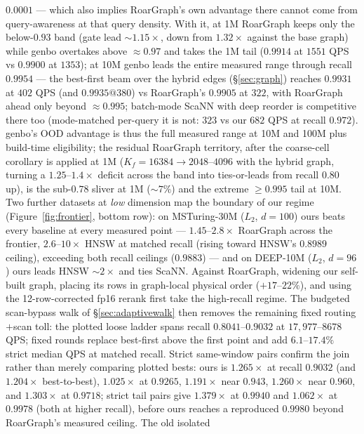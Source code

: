 \documentclass{article}
\begin{document}
$0.0001$ --- which also implies RoarGraph's own advantage there cannot come from
query-awareness at that query density. With it, at 1M RoarGraph keeps only the below-$0.93$ band
(gate lead ${\sim}1.15\times$, down from $1.32\times$ against the base graph) while
genbo overtakes above ${\approx}0.97$ and takes the 1M tail ($0.9914$ at $1551$ QPS
vs $0.9900$ at $1353$); at 10M genbo leads the entire measured range through recall $0.9954$ --- the
best-first beam over the hybrid edges (\S\ref{sec:graph}) reaches $0.9931$ at $402$
QPS (and $0.9935@380$) vs RoarGraph's $0.9905$ at $322$, with RoarGraph ahead only beyond
${\approx}0.995$; batch-mode ScaNN with deep reorder is competitive there too (mode-matched
per-query it is not: $323$ vs our $682$ QPS at recall $0.972$). genbo's OOD advantage
is thus the full measured range at 10M and 100M plus build-time eligibility; the
residual RoarGraph territory, after the coarse-cell corollary is applied at 1M
($K_f{=}16384\to2048$--$4096$ with the hybrid graph, turning a $1.25$--$1.4\times$
deficit across the band into ties-or-leads from recall $0.80$ up), is the sub-$0.78$
sliver at 1M (${\sim}7\%$) and the extreme ${\ge}0.995$ tail at 10M. Two further datasets at \emph{low} dimension map the boundary of our regime
(Figure~\ref{fig:frontier}, bottom row): on MSTuring-30M ($L_2$, $d{=}100$) ours
beats every baseline at every measured point --- $1.45$--$2.8\times$ RoarGraph across
the frontier, $2.6$--$10\times$ HNSW at matched recall (rising toward HNSW's $0.8989$
ceiling), exceeding both recall ceilings ($0.9883$) ---
and on DEEP-10M ($L_2$, $d{=}96$) ours leads HNSW ${\sim}2\times$ and ties ScaNN.
Against RoarGraph, widening our self-built graph, placing its rows in graph-local
physical order ($+17$--$22\%$), and using the 12-row-corrected fp16 rerank first
take the high-recall regime. The budgeted scan-bypass walk of
\S\ref{sec:adaptivewalk} then removes the remaining fixed routing$+$scan toll:
the plotted loose ladder spans recall $0.8041$--$0.9032$ at
$17{,}977$--$8678$ QPS; fixed rounds replace best-first above the first point and
add $6.1$--$17.4\%$ strict median QPS at matched recall.
Strict same-window pairs confirm the join rather than merely comparing plotted
bests: ours is $1.265\times$ at recall $0.9032$ (and $1.204\times$
best-to-best), $1.025\times$ at $0.9265$,
$1.191\times$ near $0.943$, $1.260\times$ near $0.960$, and
$1.303\times$ at $0.9718$; strict tail pairs give $1.379\times$ at $0.9940$
and $1.062\times$ at $0.9978$ (both at higher recall), before ours reaches a
reproduced $0.9980$ beyond RoarGraph's measured ceiling. The old isolated
\end{document}
